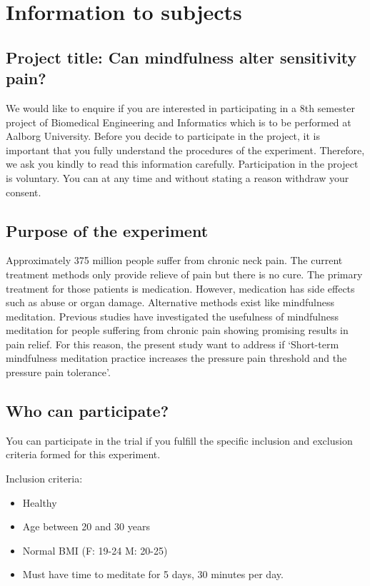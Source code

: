 \chapter{Information to subjects}
\section{Project title: Can mindfulness alter sensitivity pain?} 
We would like to enquire if you are interested in participating in a 8th semester project of Biomedical Engineering and Informatics which is to be performed at Aalborg University.
Before you decide to participate in the project, it is important that you fully understand the procedures of the experiment. Therefore, we ask you kindly to read this information carefully.
Participation in the project is voluntary. You can at any time and without stating a reason withdraw your consent.

\section{Purpose of the experiment}
Approximately 375 million people suffer from chronic neck pain. The current treatment methods only provide relieve of pain but there is no cure.  The primary treatment for those patients is medication. However, medication has side effects such as abuse or organ damage. Alternative methods exist like mindfulness meditation. Previous studies have investigated the usefulness of mindfulness meditation for people suffering from chronic pain showing promising results in pain relief. For this reason, the present study want to address if ‘Short-term mindfulness meditation practice increases the pressure pain threshold and the pressure pain tolerance’.

\section{Who can participate?}
You can participate in the trial if you fulfill the specific inclusion and exclusion criteria formed for this experiment. 

Inclusion criteria:
\begin{itemize}
	\item Healthy
	\vspace{-.3cm}
	\item Age between 20 and 30 years
	\vspace{-.3cm}
	\item Normal BMI (F: 19-24 M: 20-25)
	\vspace{-.3cm}
	\item Must have time to meditate for 5 days, 30 minutes per day.
\end{itemize}

